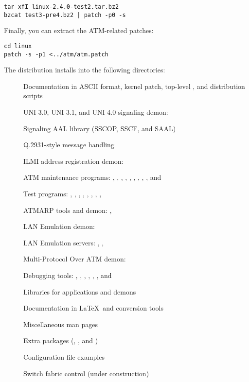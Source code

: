 \begin{verbatim}
tar xfI linux-2.4.0-test2.tar.bz2
bzcat test3-pre4.bz2 | patch -p0 -s
\end{verbatim}

Finally, you can extract the ATM-related patches:

\begin{verbatim}
cd linux
patch -s -p1 <../atm/atm.patch
\end{verbatim}

The distribution installs into the following directories:

\begin{description}
  \item[] Documentation in ASCII format, kernel patch, top-level
    , and distribution scripts
  \item[]  UNI 3.0, UNI 3.1, and UNI 4.0 signaling demon:
  \item[] Signaling AAL library (SSCOP, SSCF, and SAAL)
  \item[] Q.2931-style message handling
  \item[] ILMI address registration demon: 
  \item[] ATM maintenance programs: ,
    , , , ,
    , , , , and
  \item[] Test programs: , ,
    , , , , ,
    , 
  \item[] ATMARP tools and demon: , 
  \item[] LAN Emulation demon: 
  \item[] LAN Emulation servers: , ,
  \item[] Multi-Protocol Over ATM demon: 
  \item[] Debugging tools: ,
    , , , , ,
    and 
  \item[] Libraries for applications and demons
  \item[] Documentation in \LaTeX\ and conversion tools
  \item[] Miscellaneous man pages
  \item[] Extra packages (, , and
    )
  \item[] Configuration file examples
  \item[] Switch fabric control (under construction)
\end{description}


